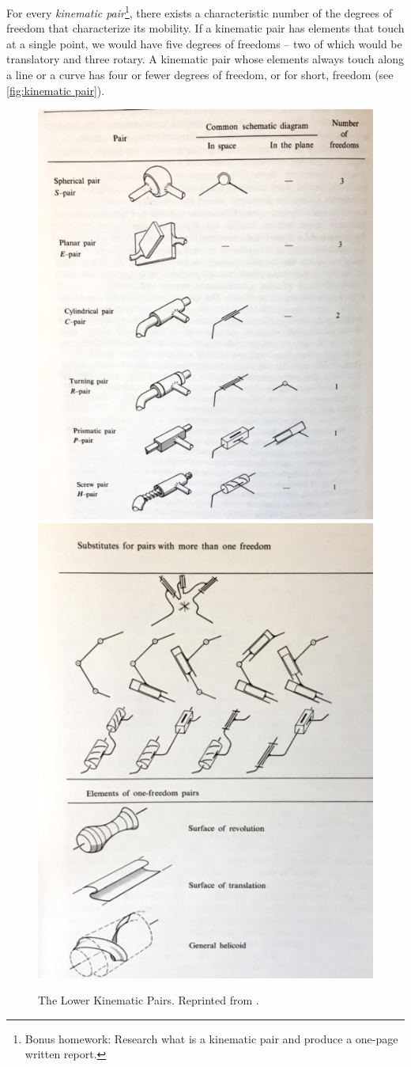  For every \textit{kinematic pair}\footnote{Bonus homework: Research what is a kinematic pair and produce a one-page written report.}, there exists a characteristic number of the degrees of freedom that characterize its mobility.  If a kinematic pair has elements that touch at a single point, we would have five degrees of freedoms -- two of which would be translatory and three rotary. A kinematic pair whose elements always touch along a line or a curve has four or fewer degrees of freedom, or for short, freedom (see \autoref{fig:kinematic pair}).
%
\begin{figure}[tb!]
	\centering
	\includegraphics[width=.46\columnwidth, height=.5\columnwidth]{figures/kinematic_pair2.jpg}
	\includegraphics[width=.46\columnwidth, height=.5\columnwidth]{figures/kinematic_pair.jpg}
	\caption{The Lower Kinematic Pairs. Reprinted from \cite{HuntBook1977}.}
	\label{fig:kinematic pair}
\end{figure}

